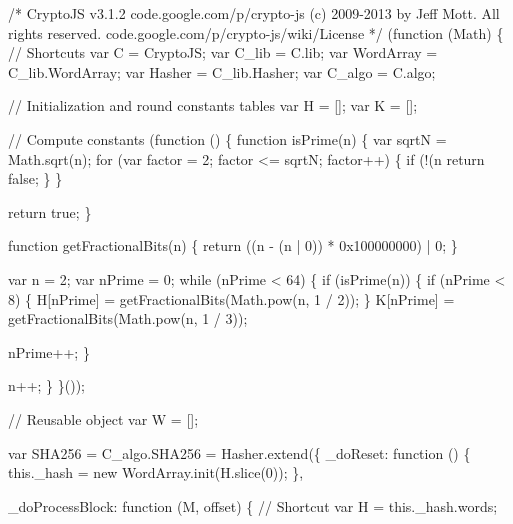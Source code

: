 \begin{DoxyCodeInclude}
\textcolor{comment}{/*}
\textcolor{comment}{CryptoJS v3.1.2}
\textcolor{comment}{code.google.com/p/crypto-js}
\textcolor{comment}{(c) 2009-2013 by Jeff Mott. All rights reserved.}
\textcolor{comment}{code.google.com/p/crypto-js/wiki/License}
\textcolor{comment}{*/}
(\textcolor{keyword}{function} (Math) \{
    \textcolor{comment}{// Shortcuts}
    var C = CryptoJS;
    var C\_lib = C.lib;
    var WordArray = C\_lib.WordArray;
    var Hasher = C\_lib.Hasher;
    var C\_algo = C.algo;

    \textcolor{comment}{// Initialization and round constants tables}
    var H = [];
    var K = [];

    \textcolor{comment}{// Compute constants}
    (\textcolor{keyword}{function} () \{
        \textcolor{keyword}{function} isPrime(n) \{
            var sqrtN = Math.sqrt(n);
            \textcolor{keywordflow}{for} (var factor = 2; factor <= sqrtN; factor++) \{
                \textcolor{keywordflow}{if} (!(n %
                    \textcolor{keywordflow}{return} \textcolor{keyword}{false};
                \}
            \}

            \textcolor{keywordflow}{return} \textcolor{keyword}{true};
        \}

        \textcolor{keyword}{function} getFractionalBits(n) \{
            \textcolor{keywordflow}{return} ((n - (n | 0)) * 0x100000000) | 0;
        \}

        var n = 2;
        var nPrime = 0;
        \textcolor{keywordflow}{while} (nPrime < 64) \{
            \textcolor{keywordflow}{if} (isPrime(n)) \{
                \textcolor{keywordflow}{if} (nPrime < 8) \{
                    H[nPrime] = getFractionalBits(Math.pow(n, 1 / 2));
                \}
                K[nPrime] = getFractionalBits(Math.pow(n, 1 / 3));

                nPrime++;
            \}

            n++;
        \}
    \}());

    \textcolor{comment}{// Reusable object}
    var W = [];

    var SHA256 = C\_algo.SHA256 = Hasher.extend(\{
        \_doReset: \textcolor{keyword}{function} () \{
            this.\_hash = \textcolor{keyword}{new} WordArray.init(H.slice(0));
        \},

        \_doProcessBlock: \textcolor{keyword}{function} (M, offset) \{
            \textcolor{comment}{// Shortcut}
            var H = this.\_hash.words;


\end{DoxyCodeInclude}
